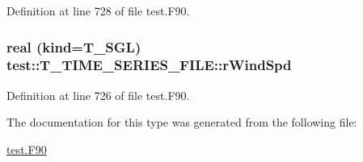 Definition at line 728 of file test.F90.

\hypertarget{typetest_1_1_t___t_i_m_e___s_e_r_i_e_s___f_i_l_e_acd05ec22cf5b09f8a2601f129525b7f0}{
\subsubsection[{rWindSpd}]{\setlength{\rightskip}{0pt plus 5cm}real (kind={\bf T\_\-SGL}) {\bf test::T\_\-TIME\_\-SERIES\_\-FILE::rWindSpd}}}
\label{typetest_1_1_t___t_i_m_e___s_e_r_i_e_s___f_i_l_e_acd05ec22cf5b09f8a2601f129525b7f0}


Definition at line 726 of file test.F90.



The documentation for this type was generated from the following file:\begin{DoxyCompactItemize}
\item 
\hyperlink{test_8_f90}{test.F90}\end{DoxyCompactItemize}
